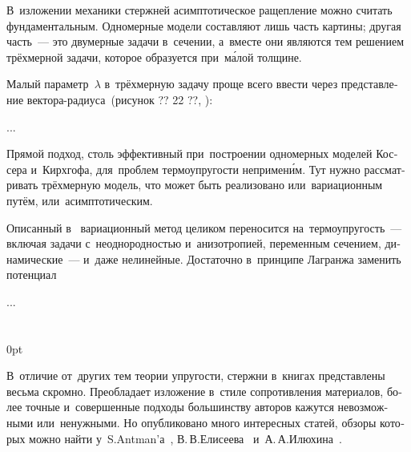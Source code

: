 \begin{otherlanguage}{russian}

В~изложении механики стержней асимптотическое ращепление можно считать фундаментальным. Одномерные модели составляют лишь часть картины; другая часть~--- это двумерные задачи в~сечении, а~вместе они являются тем решением трёхмерной задачи, которое образуется при~м\'{а}лой толщине.

Малый параметр~$\lambda$ в~трёхмерную задачу проще всего ввести через представление вектора\hbox{-}радиуса~(рисунок ?? 22 ??, ):

...



\end{otherlanguage}



\begin{otherlanguage}{russian}

Прямой подход, столь эффективный при~построении одномерных моделей Коссера и~Кирхгофа, для~проблем термоупругости непримен\'{и}м. Тут нужно рассматривать трёхмерную модель, что может быть реализовано или~вариационным путём, или~асимптотическим.

Описанный в~ вариационный метод целиком переносится на~термоупругость~--- включая задачи с~неоднородностью и~анизотропией, переменным сечением, динамические~--- и~даже нелинейные. Достаточно в~принципе Лагранжа заменить потенциал

...




\end{otherlanguage}

\section*{\small \wordforbibliography}

\begin{changemargin}{\parindent}{0pt}
\fontsize{10}{12}\selectfont

\begin{otherlanguage}{russian}

В~отличие от~других тем теории упругости, стержни в~книгах представлены весьма скромно. Преобладает изложение в~стиле сопротивления материалов, более точные и~совершенные подходы большинству авторов кажутся невозможными или~ненужными. Но опубликовано много интересных статей, обзоры которых можно найти у~S.\:Antman’а~\cite{stuartantman-theoryofrods}, В.\,В.\;Елисеева~\cite{eliseev-models} и~А.\,А.\;Илюхина~\cite{ilyuhin-elasticrods}.

\end{otherlanguage}

\end{changemargin}
